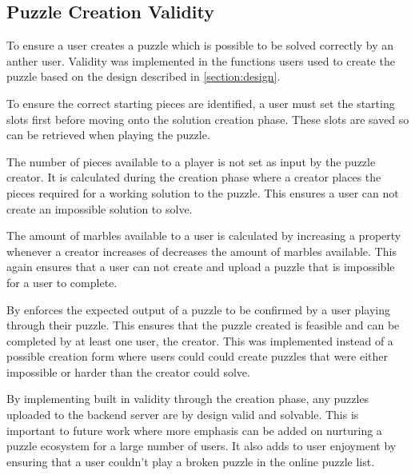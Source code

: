 \documentclass{l4proj}
\begin{document}
\subsection{Puzzle Creation Validity}
To ensure a user creates a puzzle which is possible to be solved correctly by an anther user. Validity was implemented in the functions users used to create the puzzle based on the design described in \ref{section:design}.

To ensure the correct starting pieces are identified, a user must set the starting slots first before moving onto the solution creation phase. These slots are saved so can be retrieved when playing the puzzle.

The number of pieces available to a player is not set as input by the puzzle creator. It is calculated during the creation phase where a creator places the pieces required for a working solution to the puzzle. This ensures a user can not create an impossible solution to solve.

The amount of marbles available to a user is calculated by increasing a property whenever a creator increases of decreases the amount of marbles available. This again ensures that a user can not create and upload a puzzle that is impossible for a user to complete. 

By enforces the expected output of a puzzle to be confirmed by a user playing through their puzzle. This ensures that the puzzle created is feasible and can be completed by at least one user, the creator. This was implemented instead of a possible creation form where users could could create puzzles that were either impossible or harder than the creator could solve.

By implementing built in validity through the creation phase, any puzzles uploaded to the backend server are by design valid and solvable. This is important to future work where more emphasis can be added on nurturing a puzzle ecosystem for a large number of users. It also adds to user enjoyment by ensuring that a user couldn't play a broken puzzle in the online puzzle list.

\end{document}
